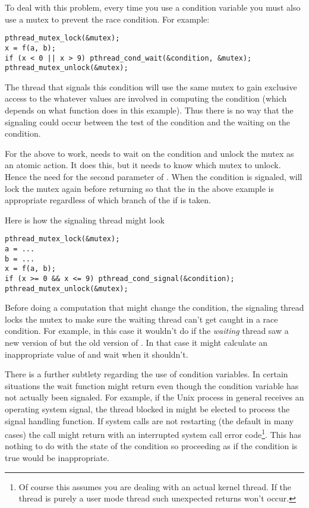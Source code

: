 To deal with this problem, every time you use a condition variable you must also use a mutex to
prevent the race condition. For example:

\begin{lstlisting}
pthread_mutex_lock(&mutex);
x = f(a, b);
if (x < 0 || x > 9) pthread_cond_wait(&condition, &mutex);
pthread_mutex_unlock(&mutex);
\end{lstlisting}

The thread that signals this condition will use the same mutex to gain exclusive access to the
whatever values are involved in computing the condition (which depends on what function
 does in this example). Thus there is no way that the signaling could occur between
the test of the condition and the waiting on the condition.

For the above to work,  needs to wait on the condition and unlock
the mutex as an atomic action. It does this, but it needs to know which mutex to unlock. Hence
the need for the second parameter of . When the condition is
signaled,  will lock the mutex again before returning so that the
 in the above example is appropriate regardless of which
branch of the if is taken.

Here is how the signaling thread might look

\begin{lstlisting}
pthread_mutex_lock(&mutex);
a = ...
b = ...
x = f(a, b);
if (x >= 0 && x <= 9) pthread_cond_signal(&condition);
pthread_mutex_unlock(&mutex);
\end{lstlisting}

Before doing a computation that might change the condition, the signaling thread locks the mutex
to make sure the waiting thread can't get caught in a race condition. For example, in this case
it wouldn't do if the \emph{waiting} thread saw a new version of  but the old version
of . In that case it might calculate an inappropriate value of  and
wait when it shouldn't.

There is a further subtlety regarding the use of condition variables. In certain situations the
wait function might return even though the condition variable has not actually been signaled.
For example, if the Unix process in general receives an operating system signal, the thread
blocked in  might be elected to process the signal handling
function. If system calls are not restarting (the default in many cases) the
 call might return with an interrupted system call error
code\footnote{Of course this assumes you are dealing with an actual kernel thread. If the thread
  is purely a user mode thread such unexpected returns won't occur.}. This has nothing to do
with the state of the condition so proceeding as if the condition is true would be
inappropriate.


